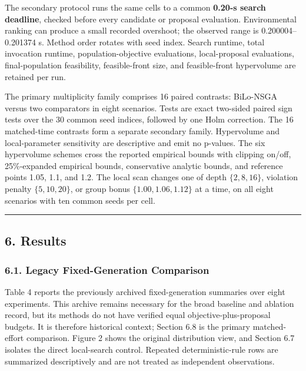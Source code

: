 \documentclass[
]{article}
\begin{document}
The secondary protocol runs the same cells to a common \textbf{0.20-s search deadline}, checked before every candidate or proposal evaluation. Environmental ranking can produce a small recorded overshoot; the observed range is 0.200004--0.201374 s. Method order rotates with seed index. Search runtime, total invocation runtime, population-objective evaluations, local-proposal evaluations, final-population feasibility, feasible-front size, and feasible-front hypervolume are retained per run.

The primary multiplicity family comprises 16 paired contrasts: BiLo-NSGA versus two comparators in eight scenarios. Tests are exact two-sided paired sign tests over the 30 common seed indices, followed by one Holm correction. The 16 matched-time contrasts form a separate secondary family. Hypervolume and local-parameter sensitivity are descriptive and emit no p-values. The six hypervolume schemes cross the reported empirical bounds with clipping on/off, 25\%-expanded empirical bounds, conservative analytic bounds, and reference points 1.05, 1.1, and 1.2. The local scan changes one of depth \(\{2,8,16\}\), violation penalty \(\{5,10,20\}\), or group bonus \(\{1.00,1.06,1.12\}\) at a time, on all eight scenarios with ten common seeds per cell.

\begin{center}\rule{0.5\linewidth}{0.5pt}\end{center}

\subsection{6. Results}\label{results}

\subsubsection{6.1. Legacy Fixed-Generation Comparison}\label{legacy-fixed-generation-comparison}

Table 4 reports the previously archived fixed-generation summaries over eight experiments. This archive remains necessary for the broad baseline and ablation record, but its methods do not have verified equal objective-plus-proposal budgets. It is therefore historical context; Section 6.8 is the primary matched-effort comparison. Figure 2 shows the original distribution view, and Section 6.7 isolates the direct local-search control. Repeated deterministic-rule rows are summarized descriptively and are not treated as independent observations.
\end{document}
